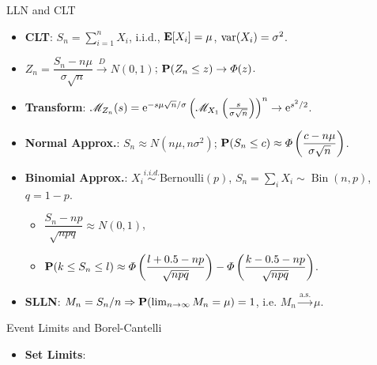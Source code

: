 \documentclass[landscape,a4paper]{article}
\begin{document}
\begin{cheatsheetcolumns}
\begin{card}{LLN and CLT}
\begin{itemize}
\begin{itemize}
\begin{itemize}
					\end{itemize}
					\item \textbf{Almost Surely}: $X_n\xrightarrow{\mathrm{a.s.}}X\Leftrightarrow \PP(\lim_nX_n=X)=1$,
					\begin{itemize}
						\item ``Almost Surely'': For almost all sample paths $\omega$.
					\end{itemize}
					\item \textbf{$r$-th Mean}: $X_n\xrightarrow{r}X\Leftrightarrow \EE[|X_n-X|^r]\to0$,
					\item \textbf{Relations}: a.s. $\Rightarrow \PP\Rightarrow D$; $r$-mean $\Rightarrow \PP\Rightarrow D$; $r\ge s\Rightarrow L^r\Rightarrow L^s$.
				\end{itemize}
				\item \textbf{CLT}: $S_n=\sum_{i=1}^nX_i$, i.i.d., $\mathbf{E}[X_i]=\mu$, $\operatorname{var}(X_i)=\sigma^2$.
				\item $Z_n=\dfrac{S_n-n\mu}{\sigma\sqrt n}\xrightarrow{D}N(0,1)$; $\mathbf{P}(Z_n\le z)\to\varPhi(z)$.
				\item \textbf{Transform}: $\mathscr{M}_{Z_n}(s)=\mathrm{e}^{-s\mu\sqrt n/\sigma}\left(\mathscr{M}_{X_1}\left(\frac{s}{\sigma\sqrt n}\right)\right)^n\to \mathrm{e}^{s^2/2}$.
				\item \textbf{Normal Approx.}: $S_n\approx N(n\mu,n\sigma^2)$; $\mathbf{P}(S_n\le c)\approx\varPhi\left(\dfrac{c-n\mu}{\sigma\sqrt n}\right)$.
				\item \textbf{Binomial Approx.}: $X_i\stackrel{i.i.d.}{\sim}\text{Bernoulli}(p)$, $S_n=\sum_iX_i\sim\operatorname{Bin}(n,p)$,\\ $q=1-p$.
				\begin{itemize}
					\item $\dfrac{S_n-np}{\sqrt{npq}}\approx N(0,1)$,
					\item $\mathbf{P}(k\le S_n\le l)\approx\varPhi\left(\dfrac{l+0.5-np}{\sqrt{npq}}\right)-\varPhi\left(\dfrac{k-0.5-np}{\sqrt{npq}}\right)$.
				\end{itemize}
				\item \textbf{SLLN}: $M_n=S_n/n\Rightarrow \mathbf{P}(\lim_{n\to\infty}M_n=\mu)=1$, i.e. $M_n\xrightarrow{\mathrm{a.s.}}\mu$.
			\end{itemize}
		\end{card}
		\begin{card}{Event Limits and Borel-Cantelli}
			\begin{itemize}
				\item \textbf{Set Limits}:
				\begin{itemize}

\end{itemize}
\end{itemize}
\end{card}
\end{cheatsheetcolumns}
\end{document}
